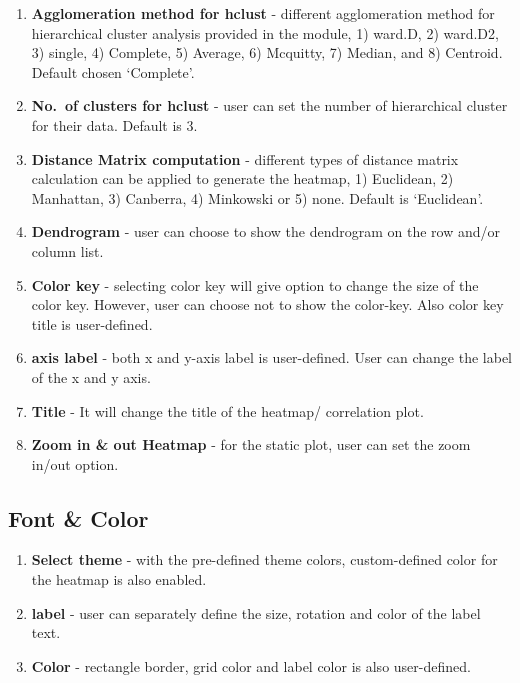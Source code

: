 \documentclass[
  a4paper,
  DIV=11,
  numbers=noendperiod,
  oneside,
  open=any]{scrreport}
\providecommand{\tightlist}{%
  \setlength{\itemsep}{0pt}\setlength{\parskip}{0pt}}\usepackage{longtable,booktabs,array}
\begin{document}
\begin{enumerate}
\def\labelenumi{\arabic{enumi}.}
\setcounter{enumi}{2}
\tightlist
\item
  \textbf{Agglomeration method for hclust} - different agglomeration
  method for hierarchical cluster analysis provided in the module, 1)
  ward.D, 2) ward.D2, 3) single, 4) Complete, 5) Average, 6) Mcquitty,
  7) Median, and 8) Centroid. Default chosen `Complete'.
\item
  \textbf{No.~of clusters for hclust} - user can set the number of
  hierarchical cluster for their data. Default is 3.
\item
  \textbf{Distance Matrix computation} - different types of distance
  matrix calculation can be applied to generate the heatmap, 1)
  Euclidean, 2) Manhattan, 3) Canberra, 4) Minkowski or 5) none. Default
  is `Euclidean'.
\item
  \textbf{Dendrogram} - user can choose to show the dendrogram on the
  row and/or column list.
\item
  \textbf{Color key} - selecting color key will give option to change
  the size of the color key. However, user can choose not to show the
  color-key. Also color key title is user-defined.
\item
  \textbf{axis label} - both x and y-axis label is user-defined. User
  can change the label of the x and y axis.
\item
  \textbf{Title} - It will change the title of the heatmap/ correlation
  plot.
\item
  \textbf{Zoom in \& out Heatmap} - for the static plot, user can set
  the zoom in/out option.
\end{enumerate}

\subsection{Font \& Color}\label{font-color}

\begin{enumerate}
\def\labelenumi{\arabic{enumi}.}
\tightlist
\item
  \textbf{Select theme} - with the pre-defined theme colors,
  custom-defined color for the heatmap is also enabled.
\item
  \textbf{label} - user can separately define the size, rotation and
  color of the label text.
\item
  \textbf{Color} - rectangle border, grid color and label color is also
  user-defined.
\end{enumerate}
\end{document}
